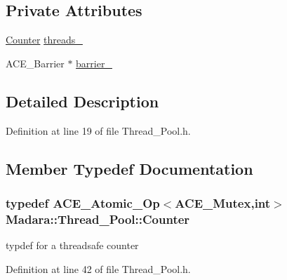 \subsection*{Private Attributes}
\begin{DoxyCompactItemize}
\item 
\hyperlink{classMadara_1_1Thread__Pool_a301b0deb023c42a89927746f3453218f}{Counter} \hyperlink{classMadara_1_1Thread__Pool_a91bae0866bed581096f3bcf9aa538e85}{threads\_\-}
\item 
ACE\_\-Barrier $\ast$ \hyperlink{classMadara_1_1Thread__Pool_a48d8574671ba53c9b04b6968b8d59e0a}{barrier\_\-}
\end{DoxyCompactItemize}


\subsection{Detailed Description}


Definition at line 19 of file Thread\_\-Pool.h.



\subsection{Member Typedef Documentation}
\hypertarget{classMadara_1_1Thread__Pool_a301b0deb023c42a89927746f3453218f}{
\subsubsection[{Counter}]{\setlength{\rightskip}{0pt plus 5cm}typedef ACE\_\-Atomic\_\-Op$<$ACE\_\-Mutex,int$>$ {\bf Madara::Thread\_\-Pool::Counter}}}
\label{de/de8/classMadara_1_1Thread__Pool_a301b0deb023c42a89927746f3453218f}


typdef for a threadsafe counter 



Definition at line 42 of file Thread\_\-Pool.h.




